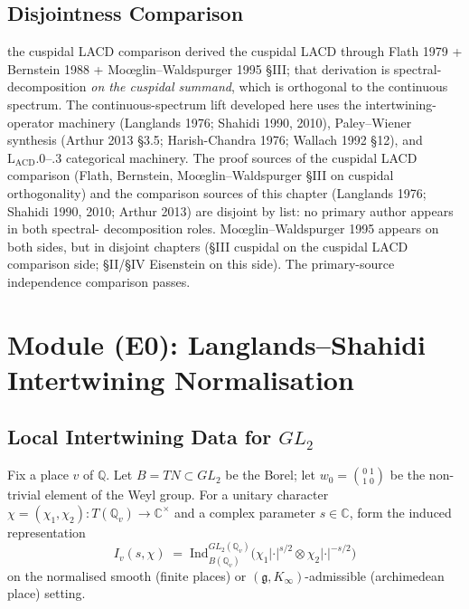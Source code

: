 \subsection{Disjointness Comparison}

the cuspidal LACD comparison derived the cuspidal LACD through Flath 1979 + Bernstein
1988 + Mo{\oe}glin--Waldspurger 1995 \S III; that derivation is
spectral-decomposition \emph{on the cuspidal summand}, which is
orthogonal to the continuous spectrum. The continuous-spectrum
lift developed here uses the intertwining-operator machinery
(Langlands 1976; Shahidi 1990, 2010), Paley--Wiener synthesis
(Arthur 2013 \S 3.5; Harish-Chandra 1976; Wallach 1992 \S 12), and
\(\mathrm{L}_{\mathrm{ACD}}.0\)--.3 categorical machinery. The
proof sources of the cuspidal LACD comparison (Flath, Bernstein, Mo{\oe}glin--Waldspurger
\S III on cuspidal orthogonality) and the comparison sources of
this chapter (Langlands 1976; Shahidi 1990, 2010; Arthur 2013) are
disjoint by list: no primary author appears in both spectral-
decomposition roles. Mo{\oe}glin--Waldspurger 1995 appears on both
sides, but in disjoint chapters (\S III cuspidal on the cuspidal LACD comparison
side; \S II/\S IV Eisenstein on this side). The primary-source independence
comparison passes.

\section{Module (E0): Langlands--Shahidi Intertwining Normalisation}
\label{v4-arith:w6-d:E0}

\subsection{Local Intertwining Data for \(GL_{2}\)}

\begin{setup}
\label{v4-arith:w6-d:setup:place-intertwining}
Fix a place \(v\) of \(\mathbb{Q}\). Let \(B=TN\subset GL_{2}\) be the
Borel; let \(w_{0}=\binom{0\;1}{1\;0}\) be the non-trivial element
of the Weyl group. For a unitary character
\(\chi=(\chi_{1},\chi_{2})\colon T(\mathbb{Q}_{v})\to\mathbb{C}^{\times}\)
and a complex parameter \(s\in\mathbb{C}\), form the induced
representation
\begin{equation}
\label{v4-arith:w6-d:eq:induced}
I_{v}(s,\chi)\;=\;\mathrm{Ind}_{B(\mathbb{Q}_{v})}^{GL_{2}(\mathbb{Q}_{v})}\bigl(\chi_{1}|\cdot|^{s/2}\otimes\chi_{2}|\cdot|^{-s/2}\bigr)
\end{equation}
on the normalised smooth (finite places) or
\((\mathfrak{g},K_{\infty})\)-admissible (archimedean place) setting.
\end{setup}

